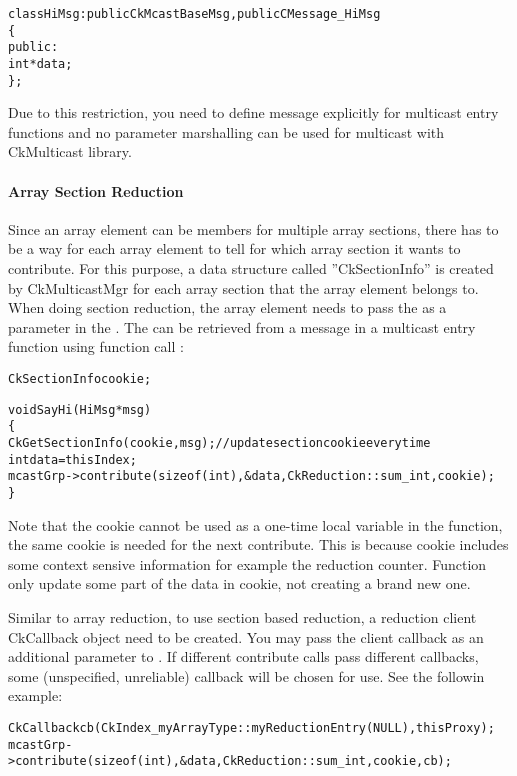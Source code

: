 \begin{alltt}
class HiMsg : public CkMcastBaseMsg, public CMessage_HiMsg
\{
public:
  int *data;
\};
\end{alltt}

Due to this restriction, you need to define message explicitly for multicast 
entry functions and no parameter marshalling can be used for multicast with 
CkMulticast library.

\paragraph{Array Section Reduction} 

Since an array element can be members for multiple array sections, 
there has to be a way for each array element to tell for which array
section it wants to contribute. For this purpose, a data structure 
called ''CkSectionInfo'' is created by CkMulticastMgr for each 
array section that the array element belongs to.
When doing section reduction, the array element needs to pass the 
 as a parameter in the . 
The  can be retrieved
from a message in a multicast entry function using function call 
:

\begin{alltt}
  CkSectionInfo cookie;

  void SayHi(HiMsg *msg)
  \{
    CkGetSectionInfo(cookie, msg);     // update section cookie every time
    int data = thisIndex;
    mcastGrp->contribute(sizeof(int), &data, CkReduction::sum_int, cookie);
  \}
\end{alltt}

Note that the cookie cannot be used as a one-time local variable in the 
function, the same cookie is needed for the next contribute. This is 
because cookie includes some context sensive information for example the 
reduction counter. Function  only update some part 
of the data in cookie, not creating a brand new one.

Similar to array reduction, to use section based reduction, a reduction
client CkCallback object need to be created. You may pass the client callback 
as an additional parameter to . If different contribute calls 
pass different callbacks, some (unspecified, unreliable) callback will be 
chosen for use. See the followin example:

\begin{alltt}
    CkCallback cb(CkIndex_myArrayType::myReductionEntry(NULL),thisProxy); 
    mcastGrp->contribute(sizeof(int), &data, CkReduction::sum_int, cookie, cb);
\end{alltt}

